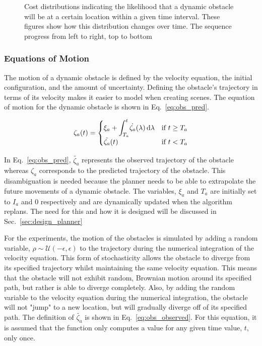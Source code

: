 \documentclass[letterpaper, 10pt, conference]{ieeeconf}
\begin{document}
\begin{figure}[h!]
    \caption{Cost distributions indicating the likelihood that a dynamic
    obstacle will be at a certain location within a given time interval. These
figures show how this distribution changes over time. The sequence progress
from left to right, top to bottom}

    \label{fig:agent_cost}

\end{figure}

\subsubsection{Equations of Motion}

\label{sec:motion}

The motion of a dynamic obstacle is defined by the velocity equation, the
initial configuration, and the amount of uncertainty. Defining the obstacle's
trajectory in terms of its velocity makes it easier to model when creating
scenes. The equation of motion for the dynamic obstacle is shown in
Eq.~\ref{eq:obs_pred}.

\begin{equation}
    \zeta_a(t) =
        \begin{cases}
            \xi_a + \mathlarger{\int_{T_a}^{t}} \dot{\zeta_a}(\lambda) \,
            \mathrm{d}\lambda
            & \text{if } t \geq T_a \\
            \tilde{\zeta_a}(t) & \text{if } t < T_a
        \end{cases}
    \label{eq:obs_pred}
\end{equation}

In Eq.~\ref{eq:obs_pred}, $\tilde{\zeta_a}$ represents the observed trajectory
of the obstacle whereas $\zeta_a$ corresponds to the predicted trajectory of
the obstacle. This disambiguation is needed because the planner needs to be
able to extrapolate the future movements of a dynamic obstacle. The variables,
$\xi_a$ and $T_a$ are initially set to $I_a$ and $0$ respectively and are
dynamically updated when the algorithm replans. The need for this and how it is
designed will be discussed in Sec.~\ref{sec:design_planner}

For the experiments, the motion of the obstacles is simulated by adding a
random variable, $\rho \sim \mathcal{U}(-\epsilon, \epsilon)$ to the trajectory
during the numerical integration of the velocity equation. This form of
stochasticity allows the obstacle to diverge from its specified trajectory
whilst maintaining the same velocity equation. This means that the obstacle
will not exhibit random, Brownian motion around its specified path, but rather
is able to diverge completely. Also, by adding the random variable to the
velocity equation during the numerical integration, the obstacle will not
"jump" to a new location, but will gradually diverge off of its specified path.
The definition of $\tilde{\zeta_a}$ is shown in Eq.~\ref{eq:obs_observed}.  For
this equation, it is assumed that the function only computes a value for any
given time value, $t$, only once.
\end{document}
